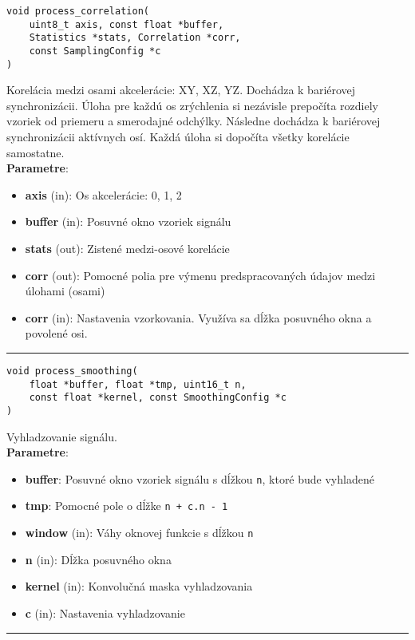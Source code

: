 \begin{lstlisting}[style=docs]
void process_correlation(
	uint8_t axis, const float *buffer, 
	Statistics *stats, Correlation *corr, 
	const SamplingConfig *c
)
\end{lstlisting}
Korelácia medzi osami akcelerácie: XY, XZ, YZ. Dochádza k bariérovej synchronizácii. 
Úloha pre každú os zrýchlenia si nezávisle prepočíta rozdiely vzoriek od priemeru a smerodajné odchýlky.
Následne dochádza k bariérovej synchronizácii aktívnych osí. Každá úloha si dopočíta všetky korelácie
samostatne.  \\ 
\textbf{Parametre}:
\begin{itemize}[noitemsep, topsep=0pt]
	\item \textbf{axis} (in): Os akcelerácie: 0, 1, 2
 	\item \textbf{buffer} (in): Posuvné okno vzoriek signálu          
 	\item \textbf{stats} (out): Zistené medzi-osové korelácie
 	\item \textbf{corr} (out): Pomocné polia pre výmenu predspracovaných údajov medzi úlohami (osami)
 	\item \textbf{corr} (in): Nastavenia vzorkovania. Využíva sa dĺžka posuvného okna a povolené osi.
\end{itemize}
\bigbreak
\hrule

\begin{lstlisting}[style=docs]
void process_smoothing(
	float *buffer, float *tmp, uint16_t n, 
	const float *kernel, const SmoothingConfig *c
)
\end{lstlisting}
Vyhladzovanie signálu. \\ 
\textbf{Parametre}:
\begin{itemize}[noitemsep, topsep=0pt]
	\item \textbf{buffer}: Posuvné okno vzoriek signálu s dĺžkou \verb|n|, ktoré bude vyhladené
	\item \textbf{tmp}: Pomocné pole o dĺžke \verb|n + c.n - 1|
 	\item \textbf{window} (in): Váhy oknovej funkcie  s dĺžkou \verb|n|
 	\item \textbf{n} (in): Dĺžka posuvného okna
 	\item \textbf{kernel} (in): Konvolučná maska vyhladzovania
 	\item \textbf{c} (in): Nastavenia vyhladzovanie
\end{itemize}
\bigbreak
\hrule

